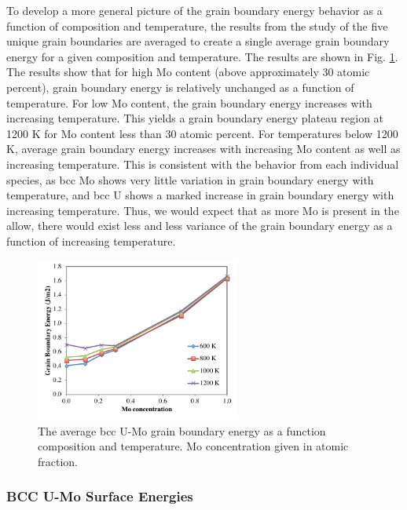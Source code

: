 \documentclass[review]{elsarticle}
\providecommand{\DIFaddtex}[1]{{\protect\color{blue} \sf #1}} %
\providecommand{\DIFaddbegin}{} %
\providecommand{\DIFaddend}{} %
\providecommand{\DIFaddbeginFL}{} %
\providecommand{\DIFaddendFL}{} %
\providecommand{\DIFdelbeginFL}{} %
\providecommand{\DIFdelendFL}{} %
\providecommand{\DIFadd}[1]{\texorpdfstring{\DIFaddtex{#1}}{#1}} %
\newcommand{\DIFscaledelfig}{0.5}
\newlength{\DIFdelgraphicswidth} %
\newlength{\DIFdelgraphicsheight} %
\newcommand{\DIFaddincludegraphics}[2][]{{\color{blue}\fbox{\DIFOincludegraphics[#1]{#2}}}} %
\newcommand{\DIFdelincludegraphics}[2][]{%
\sbox{\DIFdelgraphicsbox}{\DIFOincludegraphics[#1]{#2}}%
\settoboxwidth{\DIFdelgraphicswidth}{\DIFdelgraphicsbox} %
\settoboxtotalheight{\DIFdelgraphicsheight}{\DIFdelgraphicsbox} %
\scalebox{\DIFscaledelfig}{%
\parbox[b]{\DIFdelgraphicswidth}{\usebox{\DIFdelgraphicsbox}\\[-\baselineskip] \rule{\DIFdelgraphicswidth}{0em}}\llap{\resizebox{\DIFdelgraphicswidth}{\DIFdelgraphicsheight}{%
\setlength{\unitlength}{\DIFdelgraphicswidth}%
\begin{picture}(1,1)%
\thicklines\linethickness{2pt} %
{\color[rgb]{1,0,0}\put(0,0){\framebox(1,1){}}}%
{\color[rgb]{1,0,0}\put(0,0){\line( 1,1){1}}}%
{\color[rgb]{1,0,0}\put(0,1){\line(1,-1){1}}}%
\end{picture}%
}\hspace*{3pt}}} %
} %
\DeclareRobustCommand{\DIFaddbegin}{\DIFOaddbegin \let\includegraphics\DIFaddincludegraphics} %
\DeclareRobustCommand{\DIFaddend}{\DIFOaddend \let\includegraphics\DIFOincludegraphics} %
\DeclareRobustCommand{\DIFaddbeginFL}{\DIFOaddbeginFL \let\includegraphics\DIFaddincludegraphics} %
\DeclareRobustCommand{\DIFaddendFL}{\DIFOaddendFL \let\includegraphics\DIFOincludegraphics} %
\DeclareRobustCommand{\DIFdelbeginFL}{\DIFOdelbeginFL \let\includegraphics\DIFdelincludegraphics} %
\DeclareRobustCommand{\DIFdelendFL}{\DIFOaddendFL \let\includegraphics\DIFOincludegraphics} %
\begin{document}
To develop a more general picture of the grain boundary energy behavior as a function of composition and temperature, the results from the study of the five unique grain boundaries are averaged to create a single average grain boundary energy for a given composition and temperature. The results are shown in Fig. \ref{fig:avgvsmo}. The results show that for high Mo content (above approximately 30 atomic percent), grain boundary energy is relatively unchanged as a function of temperature. For low Mo content, the grain boundary energy increases with increasing temperature. This yields a grain boundary energy plateau region at 1200 K for Mo content less than 30 atomic percent. For temperatures below 1200 K, average grain boundary energy increases with increasing Mo content as well as increasing temperature. \DIFaddbegin \DIFadd{This is consistent with the behavior from each individual species, as bcc Mo shows very little variation in grain boundary energy with temperature, and bcc U shows a marked increase in grain boundary energy with increasing temperature. Thus, we would expect that as more Mo is present in the allow, there would exist less and less variance of the grain boundary energy as a function of increasing temperature. 
}\DIFaddend 

\begin{figure}[h]
 \centering
 \DIFdelbeginFL %
\DIFdelendFL \DIFaddbeginFL \includegraphics[width=0.6\textwidth]{avg_vs_moA.png} 
 \DIFaddendFL \caption{The average bcc U-Mo grain boundary energy as a function composition and temperature. Mo concentration given in atomic fraction.}
 \label{fig:avgvsmo}
\end{figure}

\FloatBarrier

 
\subsubsection{BCC U-Mo Surface Energies}
\end{document}

